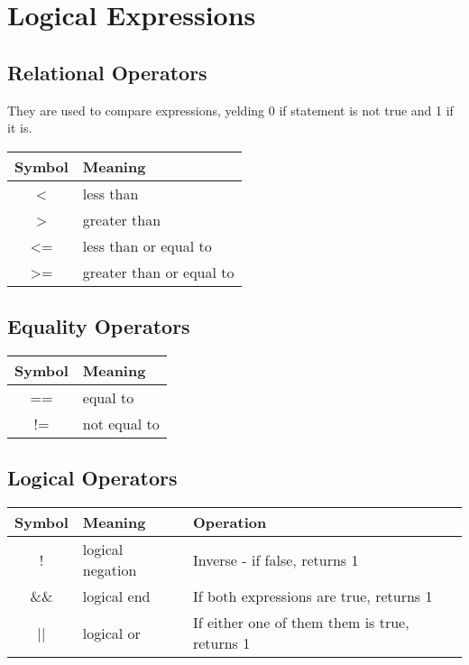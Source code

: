 \documentclass[openany]{book}
\begin{document}
    \section{Logical Expressions}
    \subsection*{Relational Operators}
    They are used to compare expressions, yelding 0 if statement is not true and 1 if it is.

    \bigskip
    \begin{tabular}{|@{} c l|}  %
        \hline
        \textbf{ Symbol} & \textbf{Meaning} \\
        \hline
        < & less than \\
        > & greater than \\
        <= & less than or equal to \\
        >= & greater than or equal to \\
        \hline
    \end{tabular} 

    \subsection*{Equality Operators}

    \bigskip
    \begin{tabular}{|@{} c l|}
        \hline
        \textbf{ Symbol} & \textbf{Meaning} \\
        \hline
        == & equal to \\
        != & not equal to \\
        \hline
    \end{tabular}

    \subsection*{Logical Operators}

    \bigskip
    \begin{tabular}{|@{} c l l|}
        \hline
        \textbf{ Symbol} & \textbf{Meaning} & \textbf{Operation} \\
        \hline
        ! & logical negation & Inverse - if false, returns 1\\
        \&\& & logical end & If both expressions are true, returns 1 \\
        || & logical or & If either one of them them is true, returns 1 \\ 
        \hline
    \end{tabular}
\end{document}
